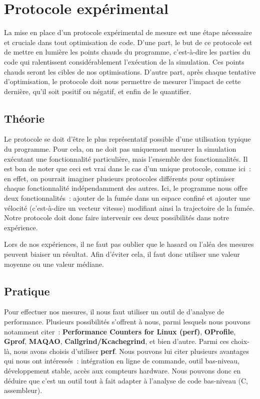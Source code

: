 \documentclass[12pt,a4paper]{article}
\begin{document}
\section{Protocole expérimental}
\label{sec.prot}

La mise en place d'un protocole expérimental de mesure est une étape nécessaire
et cruciale dans tout optimisation de code. D'une part, le but de ce protocole
est de mettre en lumière les points chauds du programme, c'est-à-dire les
parties du code qui ralentissent considérablement l'exécution de la simulation.
Ces points chauds seront les cibles de nos optimisations. D'autre part, après
chaque tentative d'optimisation, le protocole doit nous permettre de mesurer
l'impact de cette dernière, qu'il soit positif ou négatif, et enfin de le
quantifier.

\subsection{Théorie}
\label{sub.prot.theo}

Le protocole se doit d'être le plus représentatif possible d'une utilisation
typique du programme. Pour cela, on ne doit pas uniquement mesurer la simulation
exécutant une fonctionnalité particulière, mais l'ensemble des fonctionnalités.
Il est bon de noter que ceci est vrai dans le cas d'un unique protocole, comme
ici : en effet, on pourrait imaginer plusieurs protocoles différents pour
optimiser chaque fonctionnalité indépendamment des autres. Ici, le programme
nous offre deux fonctionnalités : ajouter de la fumée dans un espace confiné et
ajouter une vélocité (c'est-à-dire un vecteur vitesse) modifiant ainsi la
trajectoire de la fumée. Notre protocole doit donc faire intervenir ces deux
possibilités dans notre expérience.

Lors de nos expériences, il ne faut pas oublier que le hasard ou l'aléa des
mesures peuvent biaiser un résultat. Afin d'éviter cela, il faut donc utiliser
une valeur moyenne ou une valeur médiane.

\subsection{Pratique}
\label{sub.prot.pract}

Pour effectuer nos mesures, il nous faut utiliser un outil de d'analyse de
performance. Plusieurs possibilités s'offrent à nous, parmi lesquels nous
pouvons notamment citer : \textbf{Performance Counters for Linux (perf)},
\textbf{OProfile}, \textbf{Gprof}, \textbf{MAQAO},
\textbf{Callgrind/Kcachegrind}, et bien d'autre. Parmi ces choix-là, nous avons
choisis d'utiliser \textbf{perf}. Nous pouvons lui citer plusieurs avantages qui
nous ont intéressés : intégration en ligne de commande, outil bas-niveau,
développement stable, accès aux compteurs hardware. Nous pouvons donc en déduire
que c'est un outil tout à fait adapter à l'analyse de code bas-niveau (C,
assembleur).
\end{document}
